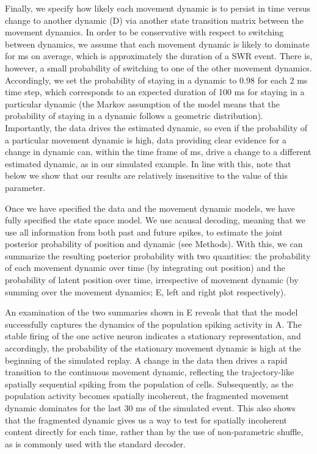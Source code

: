 \documentclass[9pt,lineno]{elife}
\begin{document}
Finally, we specify how likely each movement dynamic is to persist in time versus change to another dynamic (D) via another state transition matrix between the movement dynamics. In order to be conservative with respect to switching between dynamics, we assume that each movement dynamic is likely to dominate for  ms on average, which is approximately the duration of a SWR event. There is, however, a small probability of switching to one of the other movement dynamics. Accordingly, we set the probability of staying in a dynamic to 0.98 for each 2 ms time step, which corresponds to an expected duration of 100 ms for staying in a particular dynamic (the Markov assumption of the model means that the probability of staying in a dynamic follows a geometric distribution). Importantly, the data drives the estimated dynamic, so even if the probability of a particular movement dynamic is high, data providing clear evidence for a change in dynamic can, within the time frame of  ms, drive a change to a different estimated dynamic, as in our simulated example. In line with this, note that below we show that our results are relatively insensitive to the value of this parameter.

Once we have specified the data and the movement dynamic models, we have fully specified the state space model. We use acausal decoding, meaning that we use all information from both past and future spikes, to estimate the joint posterior probability of position and dynamic (see Methods). With this, we can summarize the resulting posterior probability with two quantities: the probability of each movement dynamic over time (by integrating out position) and the probability of latent position over time, irrespective of movement dynamic (by summing over the movement dynamics; E, left and right plot respectively). 

An examination of the two summaries shown in E reveals that that the model successfully captures the dynamics of the population spiking activity in A. The stable firing of the one active neuron indicates a stationary representation, and accordingly, the probability of the stationary movement dynamic is high at the beginning of the simulated replay. A change in the data then drives a rapid transition to the continuous movement dynamic, reflecting the trajectory-like spatially sequential spiking from the population of cells. Subsequently, as the population activity becomes spatially incoherent, the fragmented movement dynamic dominates for the last 30 ms of the simulated event. This also shows that the fragmented dynamic gives us a way to test for spatially incoherent content directly for each time, rather than by the use of non-parametric shuffle, as is commonly used with the standard decoder.  
\end{document}
